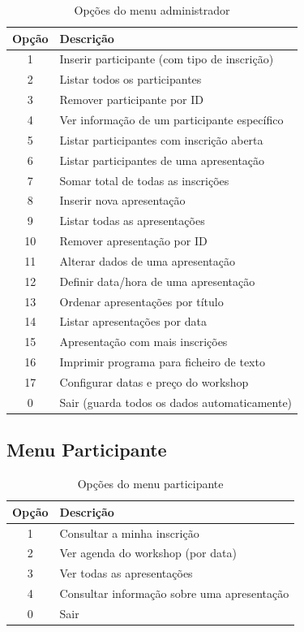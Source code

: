 \documentclass[12pt,a4paper]{article}
\begin{document}
\begin{table}[H]
\centering
\begin{tabular}{cl}
\toprule
\textbf{Opção} & \textbf{Descrição} \\
\midrule
1  & Inserir participante (com tipo de inscrição) \\
2  & Listar todos os participantes \\
3  & Remover participante por ID \\
4  & Ver informação de um participante específico \\
5  & Listar participantes com inscrição aberta \\
6  & Listar participantes de uma apresentação \\
7  & Somar total de todas as inscrições \\
8  & Inserir nova apresentação \\
9  & Listar todas as apresentações \\
10 & Remover apresentação por ID \\
11 & Alterar dados de uma apresentação \\
12 & Definir data/hora de uma apresentação \\
13 & Ordenar apresentações por título \\
14 & Listar apresentações por data \\
15 & Apresentação com mais inscrições \\
16 & Imprimir programa para ficheiro de texto \\
17 & Configurar datas e preço do workshop \\
0  & Sair (guarda todos os dados automaticamente) \\
\bottomrule
\end{tabular}
\caption{Opções do menu administrador}
\end{table}

\subsection{Menu Participante}

\begin{table}[H]
\centering
\begin{tabular}{cl}
\toprule
\textbf{Opção} & \textbf{Descrição} \\
\midrule
1 & Consultar a minha inscrição \\
2 & Ver agenda do workshop (por data) \\
3 & Ver todas as apresentações \\
4 & Consultar informação sobre uma apresentação \\
0 & Sair \\
\bottomrule
\end{tabular}
\caption{Opções do menu participante}
\end{table}
\end{document}
